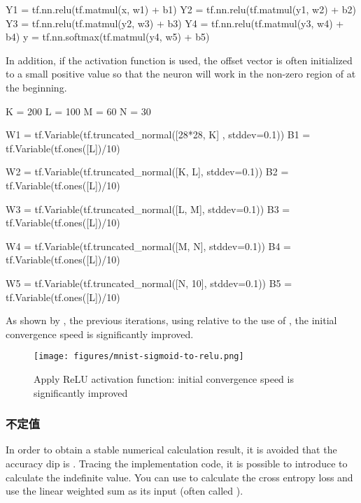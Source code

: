 \begin{content}
\begin{content}
\begin{leftbar}
\begin{python}
Y1 = tf.nn.relu(tf.matmul(x, w1) + b1)
Y2 = tf.nn.relu(tf.matmul(y1, w2) + b2)
Y3 = tf.nn.relu(tf.matmul(y2, w3) + b3)
Y4 = tf.nn.relu(tf.matmul(y3, w4) + b4)
y = tf.nn.softmax(tf.matmul(y4, w5) + b5)
\end{python}
\end{leftbar}

In addition, if the  activation function is used, the offset vector is often initialized to a small positive value so that the neuron will work in the non-zero region of  at the beginning.

\begin{leftbar}
\begin{python}
K = 200
L = 100
M = 60
N = 30

W1 = tf.Variable(tf.truncated_normal([28*28, K] , stddev=0.1)) 
B1 = tf.Variable(tf.ones([L])/10)

W2 = tf.Variable(tf.truncated_normal([K, L], stddev=0.1))
B2 = tf.Variable(tf.ones([L])/10)

W3 = tf.Variable(tf.truncated_normal([L, M], stddev=0.1)) 
B3 = tf.Variable(tf.ones([L])/10)

W4 = tf.Variable(tf.truncated_normal([M, N], stddev=0.1)) 
B4 = tf.Variable(tf.ones([L])/10)

W5 = tf.Variable(tf.truncated_normal([N, 10], stddev=0.1)) 
B5 = tf.Variable(tf.ones([L])/10)
\end{python}
\end{leftbar}

As shown by , the previous  iterations, using  relative to the use of , the initial convergence speed is significantly improved.

\begin{figure}[H]
\centering
\texttt{[image: figures/mnist-sigmoid-to-relu.png]}
\caption{Apply ReLU activation function: initial convergence speed is significantly improved}
 \label{fig:mnist-sigmoid-to-relu}
\end{figure}

\subsubsection{不定值}

In order to obtain a stable numerical calculation result, it is avoided that the accuracy dip is . Tracing the implementation code, it is possible to introduce  to calculate the  indefinite value. You can use  to calculate the cross entropy loss and use the linear weighted sum as its input (often called ).


\end{content}
\end{content}
